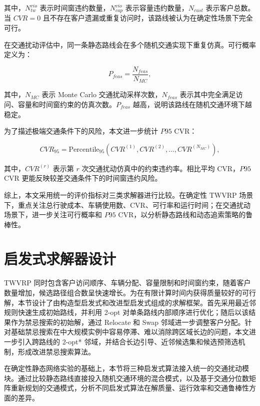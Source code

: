 \documentclass[12pt,a4paper,UTF8]{article}
\begin{document}
其中，$N_{tw}^{vio}$ 表示时间窗违约数量，$N_{cap}^{vio}$ 表示容量违约数量，$N_{cust}$ 表示客户总数。当 $CVR=0$ 且不存在客户遗漏或重复访问时，该路线被认为在确定性场景下完全可行。

在交通扰动评估中，同一条静态路线会在多个随机交通实现下重复仿真。可行概率定义为：

\begin{equation}
    P_{feas}
    =
    \frac{N_{feas}}{N_{MC}},
    \label{eq:metric_feasible_probability_simple}
\end{equation}

其中，$N_{MC}$ 表示 Monte Carlo 交通扰动采样次数，$N_{feas}$ 表示其中完全满足访问、容量和时间窗约束的仿真次数。$P_{feas}$ 越高，说明该路线在随机交通环境下越稳定。

为了描述极端交通条件下的风险，本文进一步统计 $P95$ CVR：

\begin{equation}
    CVR_{95}
    =
    \mathrm{Percentile}_{95}
    \left(
        CVR^{(1)},CVR^{(2)},\dots,CVR^{(N_{MC})}
    \right),
    \label{eq:metric_p95_cvr_simple}
\end{equation}

其中，$CVR^{(r)}$ 表示第 $r$ 次交通扰动仿真中的约束违约率。相比平均 CVR，$P95$ CVR 更能反映较差交通条件下的时间窗违约风险。

综上，本文采用统一的评价指标对三类求解器进行比较。在确定性 TWVRP 场景下，重点关注总行驶成本、车辆使用数、CVR、可行率和运行时间；在交通扰动场景下，进一步关注可行概率和 $P95$ CVR，以分析静态路线和动态追索策略的鲁棒性。


\clearpage

\section{启发式求解器设计}
\label{sec:heuristic}
TWVRP 同时包含客户访问顺序、车辆分配、容量限制和时间窗约束，随着客户数量增加，候选路径组合数呈快速增长。为在有限计算时间内获得质量较好的可行解，本节设计了由构造型启发式和改进型启发式组成的求解框架。首先采用最近邻规则快速生成初始路线，并利用 2-opt 对单条路线内部顺序进行优化；随后以该结果作为禁忌搜索的初始解，通过 Relocate 和 Swap 邻域进一步调整客户分配。针对基础禁忌搜索在中大规模实例中容易停滞、难以消除跨区域长边的问题，本文进一步引入跨路线的 2-opt* 邻域，并结合长边引导、近邻候选集和候选预筛选机制，形成改进禁忌搜索算法。

在确定性静态网络实验的基础上，本节将三种启发式算法接入统一的交通扰动模块。通过比较静态路线直接投入随机交通环境的混合模式，以及基于交通分位数矩阵重新规划的交通模式，分析不同启发式算法在解质量、运行效率和交通鲁棒性方面的差异。
\end{document}
